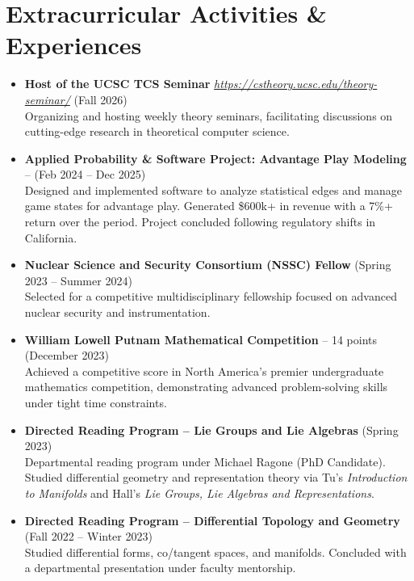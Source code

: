 \documentclass{curriculum-vitae}
\begin{document}
\section{Extracurricular Activities \& Experiences}
\begin{itemize}
    \item \textbf{Host of the UCSC TCS Seminar} \emph{\href{https://cstheory.ucsc.edu/theory-seminar/}{https://cstheory.ucsc.edu/theory-seminar/}} (Fall 2026) \\
    Organizing and hosting weekly theory seminars, facilitating discussions on cutting-edge research in theoretical computer science.

    \item \textbf{Applied Probability \& Software Project: Advantage Play Modeling} -- (Feb 2024 -- Dec 2025)\\
    Designed and implemented software to analyze statistical edges and manage game states for advantage play. Generated \$600k+ in revenue with a 7\%+ return over the period. Project concluded following regulatory shifts in California.

\item \textbf{Nuclear Science and Security Consortium (NSSC) Fellow} (Spring 2023 -- Summer 2024) \\
    Selected for a competitive multidisciplinary fellowship focused on advanced nuclear security and instrumentation.

\item \textbf{William Lowell Putnam Mathematical Competition} -- 14 points (December 2023) \\
    Achieved a competitive score in North America's premier undergraduate mathematics competition, demonstrating advanced problem-solving skills under tight time constraints.


\item \textbf{Directed Reading Program -- Lie Groups and Lie Algebras} (Spring 2023) \\
    Departmental reading program under Michael Ragone (PhD Candidate). Studied differential geometry and representation theory via Tu's \emph{Introduction to Manifolds} and Hall's \emph{Lie Groups, Lie Algebras and Representations}.

\item \textbf{Directed Reading Program -- Differential Topology and Geometry} (Fall 2022 -- Winter 2023) \\
    Studied differential forms, co/tangent spaces, and manifolds. Concluded with a departmental presentation under faculty mentorship.


\end{itemize}
\end{document}
